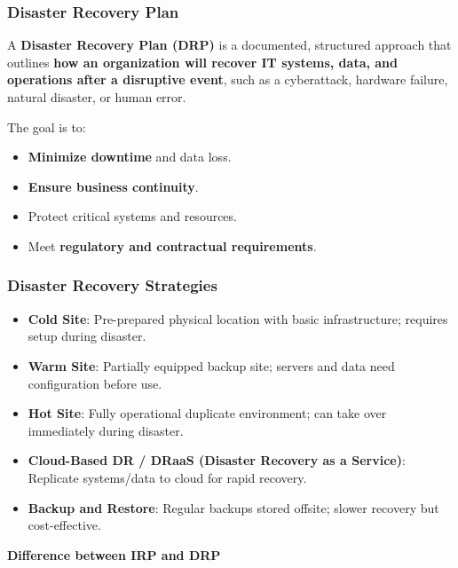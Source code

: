 \subsubsection{Disaster Recovery Plan}

\indent 

A \textbf{Disaster Recovery Plan (DRP)} is a documented, structured approach that outlines \textbf{how an organization will recover IT systems, data, and operations after a disruptive event}, such as a cyberattack, hardware failure, natural disaster, or human error.

The goal is to:

\begin{itemize}
    \item \textbf{Minimize downtime} and data loss.
    \item \textbf{Ensure business continuity}.
    \item Protect critical systems and resources.
    \item Meet \textbf{regulatory and contractual requirements}.
\end{itemize}

\subsubsection{Disaster Recovery Strategies}

\begin{itemize}
    \item \textbf{Cold Site}: Pre-prepared physical location with basic infrastructure; requires setup during disaster.
    \item \textbf{Warm Site}: Partially equipped backup site; servers and data need configuration before use.
    \item \textbf{Hot Site}: Fully operational duplicate environment; can take over immediately during disaster.
    \item \textbf{Cloud-Based DR / DRaaS (Disaster Recovery as a Service)}: Replicate systems/data to cloud for rapid recovery.
    \item \textbf{Backup and Restore}: Regular backups stored offsite; slower recovery but cost-effective.
\end{itemize}

\bigskip

\noindent\textbf{Difference between IRP and DRP}

